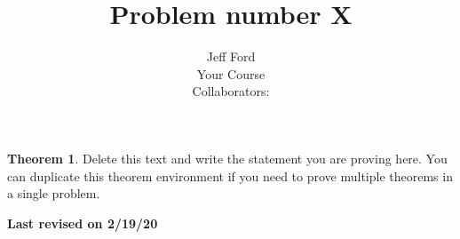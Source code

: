 \documentclass[12 pt]{article}
\theoremstyle{definition}
\newtheorem*{thm}{Theorem}
\newcommand\rev[1]{\noindent\textbf{Last revised on {#1}}\\}
\begin{document}
 
 
\title{Problem number X}%
\author{Jeff Ford\\ %
Your Course\\ %
Collaborators: } %
 
\maketitle
 
\begin{thm} 
Delete this text and write the statement you are proving here. You can duplicate this theorem environment if you need to prove multiple theorems in a single problem.
\end{thm}
\rev{2/19/20} %
\end{document}
